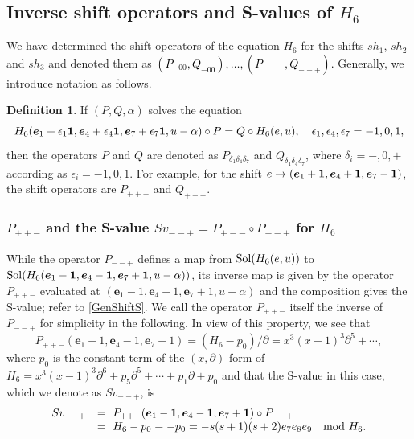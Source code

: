 \documentclass[a4paper,12pt]{article}
\theoremstyle{definition}
\newtheorem{dfn}[thm]{Definition}
\theoremstyle{remark}
\numberwithin{equation}{section} %
\newcommand{\blue}[1]{\textcolor{black}{#1}}
\begin{document}
 
\subsection{Inverse shift operators and S-values of $H_6$}
We have determined the shift operators of the equation $H_6$ 
for the shifts $sh_1$, $sh_2$ and
$sh_3$ and denoted them as \blue{$(P_{-00},Q_{-00}),\dots, (P_{--+},Q_{--+})$.} Generally,
we introduce notation as follows.
\begin{dfn}\label{E6PQnotation}
If $(P,Q,\alpha)$ solves the equation
  $$H_6({\bm e}_1+\epsilon_1{\bf 1},{\bm e}_4+\epsilon_4{\bf 1},
  {\bm e}_7+\epsilon_7{\bf 1},u-\alpha)\circ P
  =Q\circ H_6(e,u),\quad \epsilon_1,\epsilon_4,\epsilon_7 =-1, 0, 1,$$
then the operators $P$ and $Q$ are denoted as
$P_{\delta_1\delta_4\delta_7}$ and $Q_{\delta_1\delta_4\delta_7}$,
where $\delta_i={-}, {0}, {+}$ according as $\epsilon_i=-1, 0, 1$.
For example, 
for the shift 
$e\to({\bm e}_1+{\bf 1},{\bm e}_4+{\bf 1},
{\bm e}_7-{\bf 1})$, the shift operators are $P_{++-}$ and $Q_{++-}$.
\end{dfn}
\subsubsection{$P_{++-}$ and the S-value $Sv_{--+}=P_{+--}\circ P_{--+}$ for $H_6$}\label{P_0p0}
While the operator $P_{--+}$ defines a map from ${\rm Sol}(H_6({e},u))$
to ${\rm Sol}(H_6({\bm e}_1-{\bf 1},{\bm e}_4-{\bf 1},{\bm e}_7+{\bf 1},u-\alpha))$,
its inverse map is given by the operator $P_{++-}$ evaluated at
$({\bm e}_1-1,{\bm e}_4-1,{\bm e}_7+1,u-\alpha)$ and the composition gives the
S-value; refer to \ref{GenShiftS}. We call the operator $P_{++-}$
itself the inverse of $P_{--+}$ for simplicity in the following.
In view of this property, we see that
\[P_{++-}({\bm e}_1-1,{\bm e}_4-1,{\bm e}_7+1)
=(H_6-p_0)/\partial=x^3(x-1)^3\partial^5+\cdots,\]
where $p_0$ is the constant term of the $(x,\partial)$-form
of $H_6=x^3(x-1)^3\partial^6+p_5\partial^5+\cdots+p_1\partial +p_0$
and that the S-value in this case, which we denote as $Sv_{--+}$, is
\[\begin{array}{ll}Sv_{--+}&=\
  P_{++-}({\bm e}_1-{\bm1},{\bm e}_4-{\bm1},{\bm e}_7+{\bm1})\circ P_{--+}\\
&=\  H_6-p_0 \equiv -p_0=-s(s+1)(s+2)e_7e_8e_9\quad{\rm mod}\ H_6.\end{array}
\]
\end{document}
